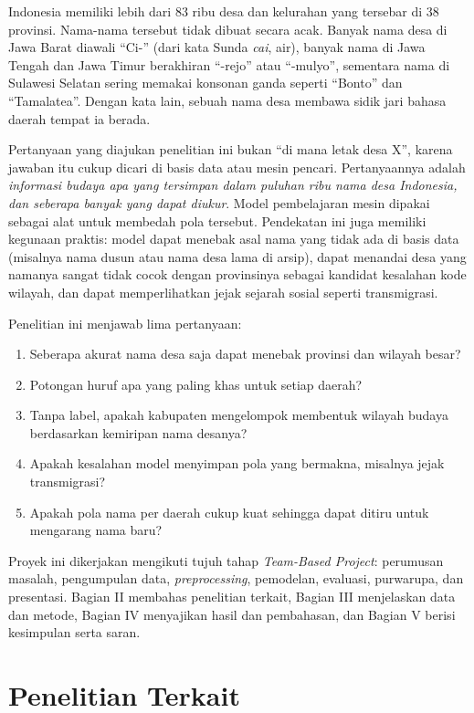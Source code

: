 \documentclass[conference]{IEEEtran}
\begin{document}
Indonesia memiliki lebih dari 83 ribu desa dan kelurahan yang tersebar di 38 provinsi. Nama-nama tersebut tidak dibuat secara acak. Banyak nama desa di Jawa Barat diawali ``Ci-'' (dari kata Sunda \textit{cai}, air), banyak nama di Jawa Tengah dan Jawa Timur berakhiran ``-rejo'' atau ``-mulyo'', sementara nama di Sulawesi Selatan sering memakai konsonan ganda seperti ``Bonto'' dan ``Tamalatea''. Dengan kata lain, sebuah nama desa membawa sidik jari bahasa daerah tempat ia berada.

Pertanyaan yang diajukan penelitian ini bukan ``di mana letak desa X'', karena jawaban itu cukup dicari di basis data atau mesin pencari. Pertanyaannya adalah \textit{informasi budaya apa yang tersimpan dalam puluhan ribu nama desa Indonesia, dan seberapa banyak yang dapat diukur}. Model pembelajaran mesin dipakai sebagai alat untuk membedah pola tersebut. Pendekatan ini juga memiliki kegunaan praktis: model dapat menebak asal nama yang tidak ada di basis data (misalnya nama dusun atau nama desa lama di arsip), dapat menandai desa yang namanya sangat tidak cocok dengan provinsinya sebagai kandidat kesalahan kode wilayah, dan dapat memperlihatkan jejak sejarah sosial seperti transmigrasi.

Penelitian ini menjawab lima pertanyaan:
\begin{enumerate}
\item Seberapa akurat nama desa saja dapat menebak provinsi dan wilayah besar?
\item Potongan huruf apa yang paling khas untuk setiap daerah?
\item Tanpa label, apakah kabupaten mengelompok membentuk wilayah budaya berdasarkan kemiripan nama desanya?
\item Apakah kesalahan model menyimpan pola yang bermakna, misalnya jejak transmigrasi?
\item Apakah pola nama per daerah cukup kuat sehingga dapat ditiru untuk mengarang nama baru?
\end{enumerate}

Proyek ini dikerjakan mengikuti tujuh tahap \textit{Team-Based Project}: perumusan masalah, pengumpulan data, \textit{preprocessing}, pemodelan, evaluasi, purwarupa, dan presentasi. Bagian II membahas penelitian terkait, Bagian III menjelaskan data dan metode, Bagian IV menyajikan hasil dan pembahasan, dan Bagian V berisi kesimpulan serta saran.

\section{Penelitian Terkait}
\end{document}
